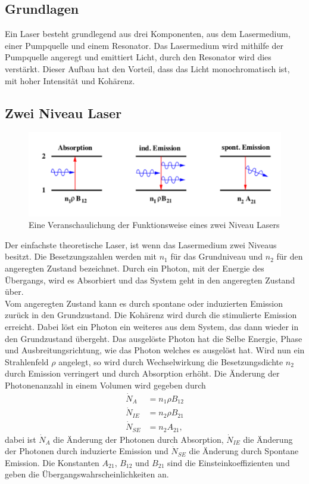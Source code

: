 \subsection{Grundlagen}

Ein Laser besteht grundlegend aus drei Komponenten, aus dem Lasermedium, einer Pumpquelle und einem Resonator. Das Lasermedium wird mithilfe der Pumpquelle angeregt und emittiert Licht, durch den Resonator wird dies verstärkt. Dieser Aufbau hat den Vorteil, dass das Licht monochromatisch ist, mit hoher Intensität und Kohärenz.
\subsection{Zwei Niveau Laser}
\begin{figure}
\centering
\includegraphics[scale=0.75]{../Grafiken/Emission.pdf}
\caption{Eine Veranschaulichung der Funktionsweise eines zwei Niveau Lasers\cite{V61}\label{Emission}}
\end{figure}
Der einfachste theoretische Laser, ist wenn das Lasermedium  zwei Niveaus besitzt. Die Besetzungszahlen werden mit $n_1$ für das Grundniveau und $n_2$ für den angeregten Zustand bezeichnet. Durch ein Photon, mit der Energie des Übergangs, wird es Absorbiert und das System geht in den angeregten Zustand über.\\
Vom angeregten Zustand kann es durch spontane oder induzierten Emission zurück in den Grundzustand. Die Kohärenz wird durch die stimulierte Emission erreicht. Dabei löst ein Photon ein weiteres aus dem System, das dann wieder in den Grundzustand übergeht. Das ausgelöste Photon hat die Selbe Energie, Phase und Ausbreitungsrichtung, wie das Photon welches es ausgelöst hat. Wird nun ein Strahlenfeld $\rho$ angelegt, so wird durch Wechselwirkung die Besetzungsdichte $n_2$ durch Emission verringert und durch Absorption erhöht.
Die Änderung der Photonenanzahl in einem Volumen wird gegeben durch
\begin{align}
\dot{N}_A&=n_1 \rho B_{12}\\
\dot{N}_{IE}&=n_2\rho B_{21}\\
\dot{N}_{SE}&=n_2A_{21},
\end{align} dabei ist $\dot{N}_A$ die Änderung der Photonen durch Absorption, $\dot{N}_{IE}$ die Änderung der Photonen durch induzierte Emission und $\dot{N}_{SE}$ die Änderung durch Spontane Emission. Die Konstanten $A_{21}$, $B_{12}$ und $B_{21}$ sind die Einsteinkoeffizienten und geben die Übergangswahrscheinlichkeiten an.\\
